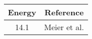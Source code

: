 \begin{tabular}{|c||c|} 
    \hline 
    \bf{Energy} & \bf{Reference} \\
    \hline
    \hline 
    14.1 & Meier et al. \cite{Meier1969}\\
    \hline
\end{tabular}
